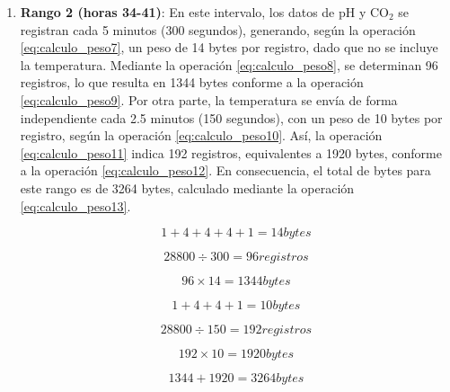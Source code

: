 \begin{enumerate}
    \item \textbf{Rango 2 (horas 34-41)}: En este intervalo, los datos de pH y CO$_2$ se registran cada 5 minutos (300 segundos), generando, según la operación \ref{eq:calculo_peso7}, un peso de 14 bytes por registro, dado que no se incluye la temperatura. Mediante la operación \ref{eq:calculo_peso8}, se determinan 96 registros, lo que resulta en 1344 bytes conforme a la operación \ref{eq:calculo_peso9}. Por otra parte, la temperatura se envía de forma independiente cada 2.5 minutos (150 segundos), con un peso de 10 bytes por registro, según la operación \ref{eq:calculo_peso10}. Así, la operación \ref{eq:calculo_peso11} indica 192 registros, equivalentes a 1920 bytes, conforme a la operación \ref{eq:calculo_peso12}. En consecuencia, el total de bytes para este rango es de 3264 bytes, calculado mediante la operación \ref{eq:calculo_peso13}.

        \begin{equation}
        1 + 4 + 4 + 4 + 1 = 14 bytes
        \label{eq:calculo_peso7}
        \end{equation}

        \begin{equation}
        28800 \div 300 = 96 registros
        \label{eq:calculo_peso8}
        \end{equation}

        \begin{equation}
        96 \times 14 = 1344 bytes
        \label{eq:calculo_peso9}
        \end{equation}

        \begin{equation}
        1 + 4 + 4 + 1 = 10 bytes
        \label{eq:calculo_peso10}
        \end{equation}

        \begin{equation}
        28800 \div 150 = 192 registros
        \label{eq:calculo_peso11}
        \end{equation}

        \begin{equation}
        192 \times 10 = 1920 bytes
        \label{eq:calculo_peso12}
        \end{equation}

        \begin{equation}
        1344 + 1920 = 3264 bytes
        \label{eq:calculo_peso13}
        \end{equation}
    

\end{enumerate}
